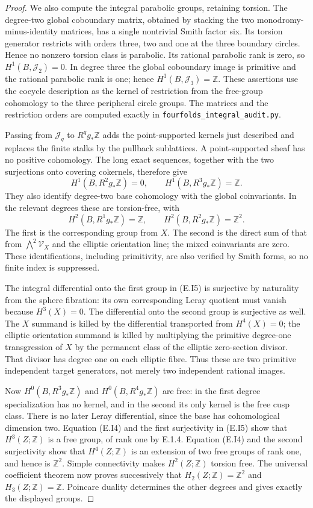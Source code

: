 \begin{proof}
We also compute the integral parabolic groups, retaining torsion.
The degree-two global coboundary matrix, obtained by stacking
the two monodromy-minus-identity matrices, has a single nontrivial
Smith factor six. Its torsion generator restricts with orders
three, two and one at the three boundary circles. Hence no
nonzero torsion class is parabolic. Its rational parabolic rank
is zero, so \(H^1(B,\mathcal J_2)=0\). In degree three the
global coboundary image is primitive and the rational parabolic
rank is one; hence \(H^1(B,\mathcal J_3)=\mathbb Z\).
These assertions use the cocycle description as the kernel of
restriction from the free-group cohomology to the three
peripheral circle groups. The matrices and the restriction
orders are computed exactly in
\texttt{fourfolds\_integral\_audit.py}.

Passing from \(\mathcal J_q\) to \(R^qg_*\mathbb Z\)
adds the point-supported kernels just described and replaces
the finite stalks by the pullback sublattices. A point-supported
sheaf has no positive cohomology. The long exact sequences,
together with the two surjections onto covering cokernels,
therefore give
\[
 H^1(B,R^2g_*\mathbb Z)=0,\qquad
 H^1(B,R^3g_*\mathbb Z)=\mathbb Z.
 \tag{E.I4}
\]
They also identify degree-two base cohomology with the global
coinvariants. In the relevant degrees these are torsion-free,
with
\[
 H^2(B,R^1g_*\mathbb Z)=\mathbb Z,
 \qquad H^2(B,R^2g_*\mathbb Z)=\mathbb Z^2.
 \tag{E.I5}
\]
The first is the corresponding group from \(X\). The second
is the direct sum of that from \(\bigwedge^2\mathcal V_X\)
and the elliptic orientation line; the mixed coinvariants are
zero. These identifications, including primitivity, are also
verified by Smith forms, so no finite index is suppressed.

The integral differential onto the first group in (E.I5) is
surjective by naturality from the sphere fibration: its own
corresponding Leray quotient must vanish because \(H^3(X)=0\).
The differential onto the second group is surjective as well.
The \(X\) summand is killed by the differential transported
from \(H^4(X)=0\); the elliptic orientation summand is killed
by multiplying the primitive degree-one transgression of \(X\)
by the permanent class of the elliptic zero-section divisor.
That divisor has degree one on each elliptic fibre. Thus these
are two primitive independent target generators, not merely two
independent rational images.

Now \(H^0(B,R^3g_*\mathbb Z)\) and
\(H^0(B,R^4g_*\mathbb Z)\) are free: in the first degree
specialization has no kernel, and in the second its only
kernel is the free cusp class. There is no later Leray
differential, since the base has cohomological dimension two.
Equation (E.I4) and the first surjectivity in (E.I5) show that
\(H^3(Z;\mathbb Z)\) is a free group, of rank one by E.1.4.
Equation (E.I4) and the second surjectivity show that
\(H^4(Z;\mathbb Z)\) is an extension of two free groups of
rank one, and hence is \(\mathbb Z^2\).
Simple connectivity makes \(H^2(Z;\mathbb Z)\) torsion free.
The universal coefficient theorem now proves successively that
\(H_2(Z;\mathbb Z)=\mathbb Z^2\) and
\(H_3(Z;\mathbb Z)=\mathbb Z\). Poincare duality determines
the other degrees and gives exactly the displayed groups.
\end{proof}
